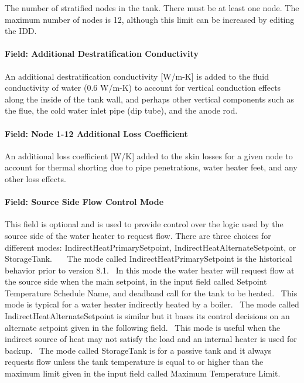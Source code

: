 The number of stratified nodes in the tank. There must be at least one node. The maximum number of nodes is 12, although this limit can be increased by editing the IDD.

\paragraph{Field: Additional Destratification Conductivity}\label{field-additional-destratification-conductivity-000}

An additional destratification conductivity {[}W/m-K{]} is added to the fluid conductivity of water (0.6 W/m-K) to account for vertical conduction effects along the inside of the tank wall, and perhaps other vertical components such as the flue, the cold water inlet pipe (dip tube), and the anode rod.

\paragraph{Field: Node 1-12 Additional Loss Coefficient}\label{field-node-1-12-additional-loss-coefficient}

An additional loss coefficient {[}W/K{]} added to the skin losses for a given node to account for thermal shorting due to pipe penetrations, water heater feet, and any other loss effects.

\paragraph{Field: Source Side Flow Control Mode}\label{field-source-side-flow-control-mode-1}

This field is optional and is used to provide control over the logic used by the source side of the water heater to request flow. There are three choices for different modes: IndirectHeatPrimarySetpoint, IndirectHeatAlternateSetpoint, or StorageTank.~~~ The mode called IndirectHeatPrimarySetpoint is the historical behavior prior to version 8.1.~ In this mode the water heater will request flow at the source side when the main setpoint, in the input field called Setpoint Temperature Schedule Name, and deadband call for the tank to be heated.~ This mode is typical for a water heater indirectly heated by a boiler.~ The mode called IndirectHeatAlternateSetpoint is similar but it bases its control decisions on an alternate setpoint given in the following field.~ This mode is useful when the indirect source of heat may not satisfy the load and an internal heater is used for backup.~ The mode called StorageTank is for a passive tank and it always requests flow unless the tank temperature is equal to or higher than the maximum limit given in the input field called Maximum Temperature Limit.

